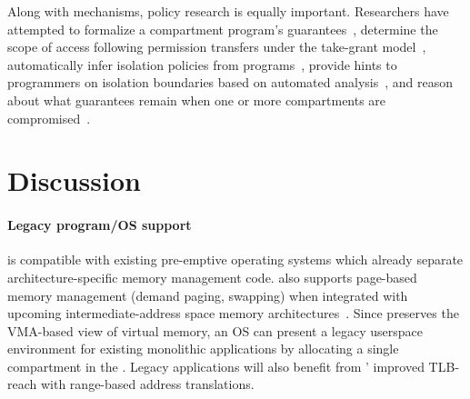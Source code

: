 Along with mechanisms, policy research is equally important.
Researchers have attempted to formalize a compartment program's 
guarantees~\cite{JuglaretHAEP16}, determine the scope of access following
permission transfers under the take-grant model~\cite{LiptonS77},
automatically infer isolation policies from 
programs~\cite{RoesslerAPMPKPB21,KirthDCLDGNVF22,VasilakisKRDDS17},
provide hints to programmers on isolation boundaries based on
automated analysis~\cite{GudkaWACDLMNR15}, and
reason about what guarantees remain when one or more compartments are
compromised~\cite{AbateABEFHLPST18}. 

\section{Discussion}
\label{sec:seccells:discussion}

\paragraph{Legacy program/OS support}
\seccells is compatible with existing pre-emptive operating systems which 
already separate architecture-specific memory management code.
\seccells also supports page-based memory management (demand paging, swapping)
when integrated with upcoming intermediate-address space memory 
architectures~\cite{ZhangSRL10,0003BOBFP21midgard}.
Since \seccells preserves the VMA-based view of virtual memory, 
an OS can present a legacy userspace environment for existing monolithic
applications by allocating a single compartment in the \ptable.
Legacy applications will also benefit from \seccells' improved 
TLB-reach with range-based address translations.

